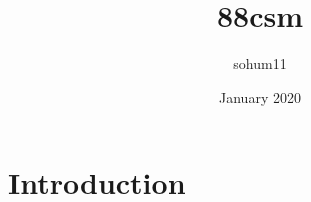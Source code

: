 \documentclass{article}
\title{88csm}
\author{sohum11 }
\date{January 2020}
\begin{document}
\maketitle

\section{Introduction}
\end{document}
